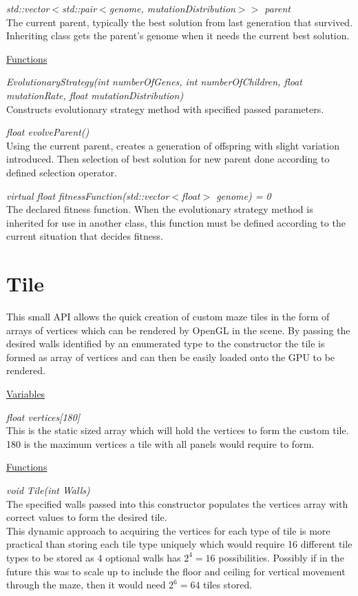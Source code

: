 \documentclass{report}
\begin{document}
\textit{std::vector$<$std::pair$<$genome, mutationDistribution$>>$ parent}\\
The current parent, typically the best solution from last generation that survived. Inheriting class gets the parent's genome when it needs the current best solution.

\noindent\underline{Functions}

\textit{EvolutionaryStrategy(int numberOfGenes, int numberOfChildren, float mutationRate, float mutationDistribution)}\\
Constructs evolutionary strategy method with specified passed parameters.

\textit{float evolveParent()}\\
Using the current parent, creates a generation of offspring with slight variation introduced. Then selection of best solution for new parent done 
according to defined selection operator.

\textit{virtual float fitnessFunction(std::vector$<$float$>$ genome) = 0}\\
The declared fitness function. When the evolutionary strategy method is inherited for use in another class, this function must be defined according
to the current situation that decides fitness.


\section{Tile}
This small API allows the quick creation of custom maze tiles in the form of arrays of vertices which can be rendered by OpenGL in the scene.
By passing the desired walls identified by an enumerated type to the constructor the tile is formed as array of vertices and can then be easily loaded onto the GPU to be rendered.

\noindent\underline{Variables}

\textit{float vertices[180]}\\
This is the static sized array which will hold the vertices to form the custom tile. 180 is the maximum vertices a tile with all panels would require to form.

\noindent\underline{Functions}

\textit{void Tile(int Walls)}\\
The specified walls passed into this constructor populates the vertices array with correct values to form the desired tile.\\
This dynamic approach to acquiring the vertices for each type of tile is more practical than storing each tile type uniquely which would require 
16 different tile types to be stored as 4 optional walls has $2^4 = 16$ possibilities. Possibly if in the future this was to scale up to include the floor and ceiling for vertical movement
through the maze, then it would need $2^6 = 64$ tiles stored.
\end{document}
